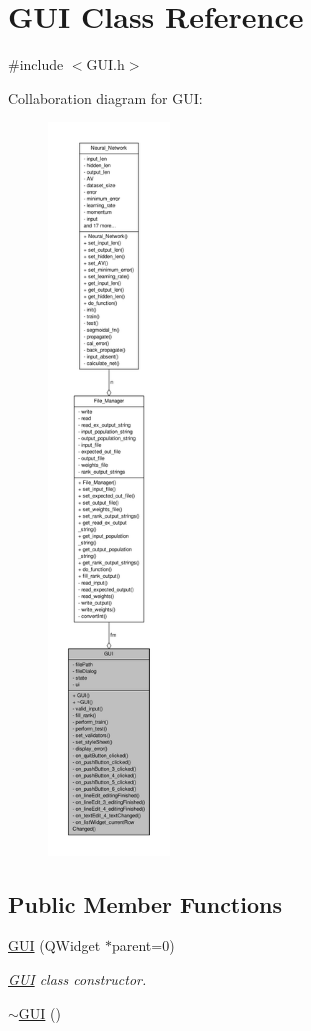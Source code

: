 \hypertarget{a00002}{\section{G\-U\-I Class Reference}
\label{d7/d46/a00002}
}


{\ttfamily \#include $<$G\-U\-I.\-h$>$}



Collaboration diagram for G\-U\-I\-:\nopagebreak
\begin{figure}[H]
\begin{center}
\leavevmode
\includegraphics[height=550pt]{d5/df9/a00044}
\end{center}
\end{figure}
\subsection*{Public Member Functions}
\begin{DoxyCompactItemize}
\item 
\hyperlink{a00002_acb0ba8c6fc121d814d30560e2c29f2fe}{G\-U\-I} (Q\-Widget $\ast$parent=0)
\begin{DoxyCompactList}\small\item\em \hyperlink{a00002}{G\-U\-I} class constructor. \end{DoxyCompactList}\item 
\hyperlink{a00002_ac9cae2328dcb5d83bdfaeca49a2eb695}{$\sim$\-G\-U\-I} ()
\end{DoxyCompactItemize}
